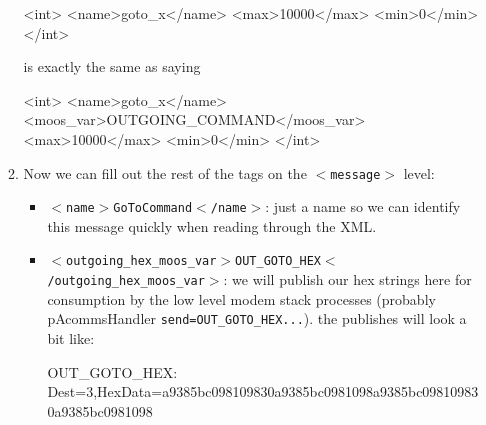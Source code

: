 \documentclass[11pt, letterpaper, oneside]{memoir}
\newcommand{\xmltag}[1]{\texttt{$<$#1$>$}}
\begin{document}
\begin{itemize}
\begin{enumerate}
\begin{small}
\begin{boxedverbatim}
      <int>
        <name>goto_x</name>
        <max>10000</max>
        <min>0</min>
      </int>
\end{boxedverbatim}
\resetbvlinenumber
\end{small}
is exactly the same as saying 
\begin{small}
\begin{boxedverbatim}
      <int>
        <name>goto_x</name>
        <moos_var>OUTGOING_COMMAND</moos_var>
        <max>10000</max>
        <min>0</min>
      </int>
\end{boxedverbatim}
\resetbvlinenumber
\end{small}

\item Now we can fill out the rest of the tags on the \xmltag{message} level:
\begin{itemize}
\item \xmltag{name$>$GoToCommand$<$/name}: just a name so we can identify this message quickly when reading through the XML.
\item \xmltag{outgoing\_hex\_moos\_var$>$OUT\_GOTO\_HEX$<$/outgoing\_hex\_moos\_var}: we will publish our hex strings here for consumption by the low level modem stack processes (probably pAcommsHandler \verb|send=OUT_GOTO_HEX...|). the publishes will look a bit like:
\begin{small}
\begin{boxedverbatim}
OUT_GOTO_HEX: Dest=3,HexData=a9385bc098109830a9385bc0981098a9385bc098109830a9385bc0981098
\end{boxedverbatim}
\resetbvlinenumber
\end{small}


\end{itemize}
\end{enumerate}
\end{itemize}
\end{document}

